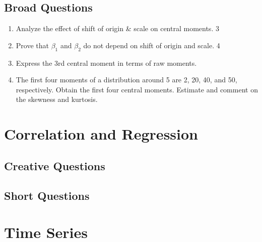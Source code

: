 \documentclass[a4paper,oneside]{book}
\begin{document}
\section{Broad Questions}
    \begin{enumerate}
    \item Analyze the effect of shift of origin \& scale on central moments. \hfill 3
    \item Prove that $\beta_1$ and $\beta_2$ do not depend on shift of origin and scale. \hfill 4
    \item Express the 3rd central moment in terms of raw moments. 
    \item The first four moments of a distribution around 5 are 2, 20, 40, and 50, respectively. Obtain the first four central moments. Estimate and comment on the skewness and kurtosis. 
    \end{enumerate}

\chapter{Correlation and Regression} 
\section{Creative Questions}
\section{Short Questions}

\chapter{Time Series} 
\end{document}
